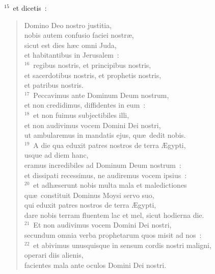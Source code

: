 ${}^{15}$~et dicetis~: \begin{flushleft}\begin{verse}Domino Deo nostro justitia,\\ nobis autem confusio faciei nostr\ae ,\\ sicut est dies h\ae c omni Juda,\\ et habitantibus in Jerusalem~:\\
${}^{16}$~regibus nostris, et principibus nostris,\\ et sacerdotibus nostris, et prophetis nostris,\\ et patribus nostris.\\
${}^{17}$~Peccavimus ante Dominum Deum nostrum,\\ et non credidimus, diffidentes in eum~:\\
${}^{18}$~et non fuimus subjectibiles illi,\\ et non audivimus vocem Domini Dei nostri,\\ ut ambularemus in mandatis ejus, qu\ae\ dedit nobis.\\
${}^{19}$~A die qua eduxit patres nostros de terra \AE gypti,\\ usque ad diem hanc,\\ eramus incredibiles ad Dominum Deum nostrum~:\\ et dissipati recessimus, ne audiremus vocem ipsius~:\\
${}^{20}$~et adh\ae serunt nobis multa mala et maledictiones\\ qu\ae\ constituit Dominus Moysi servo suo,\\ qui eduxit patres nostros de terra \AE gypti,\\ dare nobis terram fluentem lac et mel, sicut hodierna die.\\
${}^{21}$~Et non audivimus vocem Domini Dei nostri,\\ secundum omnia verba prophetarum quos misit ad nos~:\\
${}^{22}$~et abivimus unusquisque in sensum cordis nostri maligni,\\ operari diis alienis,\\ facientes mala ante oculos Domini Dei nostri.\end{verse}\end{flushleft}


